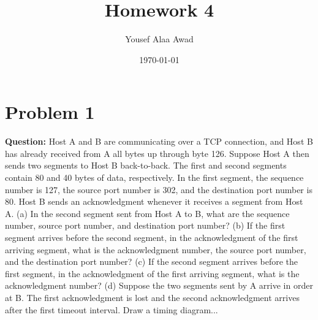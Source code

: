 \documentclass[12pt, letterpaper]{article}
\title{\textbf{Homework 4}}
\author{Yousef Alaa Awad}
\date{\today}
\newcommand{\problem}[1]{\section*{Problem #1}}
\newcommand{\question}[1]{\noindent\textbf{Question: }#1\par\vspace{0.5em}}
\begin{document}
\maketitle

\problem{1}
\question{Host A and B are communicating over a TCP connection, and Host B has already received from A all bytes up through byte 126. Suppose Host A then sends two segments to Host B back-to-back. The first and second segments contain 80 and 40 bytes of data, respectively. In the first segment, the sequence number is 127, the source port number is 302, and the destination port number is 80. Host B sends an acknowledgment whenever it receives a segment from Host A. (a) In the second segment sent from Host A to B, what are the sequence number, source port number, and destination port number? (b) If the first segment arrives before the second segment, in the acknowledgment of the first arriving segment, what is the acknowledgment number, the source port number, and the destination port number? (c) If the second segment arrives before the first segment, in the acknowledgment of the first arriving segment, what is the acknowledgment number? (d) Suppose the two segments sent by A arrive in order at B. The first acknowledgment is lost and the second acknowledgment arrives after the first timeout interval. Draw a timing diagram...}
\end{document}
